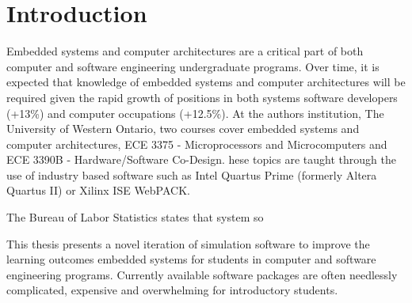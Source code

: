 \chapter{Introduction}


Embedded systems and computer architectures are a critical part of both computer and software engineering undergraduate programs\cite[appendix, p.~73-76]{cec2016}\cite[p.~33]{sec2015}. Over time, it is expected that knowledge of embedded systems and computer architectures will be required given the rapid growth of positions in both systems software developers (+13\%) and computer occupations (+12.5\%)\cite{bls2014}. At the authors institution, The University of Western Ontario, two courses cover embedded systems and computer architectures, ECE 3375 - Microprocessors and Microcomputers and ECE 3390B - Hardware/Software Co-Design\cite{eceOutlines}. hese topics are taught through the use of industry based software such as Intel Quartus Prime (formerly Altera Quartus II)\cite{quartus} or Xilinx ISE WebPACK\cite{xilinxISE}.

The Bureau of Labor Statistics states that system so

This thesis presents a novel iteration of simulation software to improve the learning outcomes embedded systems for students in computer and software engineering programs. Currently available software packages are often needlessly complicated, expensive and overwhelming for introductory students. 

